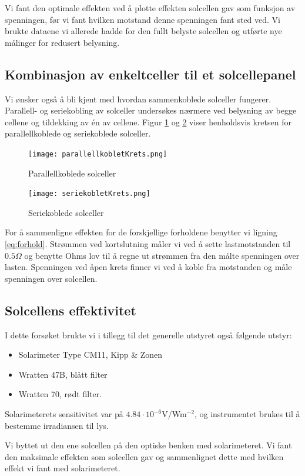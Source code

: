 \documentclass[a4paper,11pt, twocolumn]{article}
\begin{document}
Vi fant den optimale effekten ved å plotte effekten solcellen gav som funksjon av spenningen, før vi fant hvilken motstand denne spenningen fant sted ved. Vi brukte dataene vi allerede hadde for den fullt belyste solcellen og utførte nye målinger for redusert belysning.
\subsection{Kombinasjon av enkeltceller til et solcellepanel}
Vi ønsker også å bli kjent med hvordan sammenkoblede solceller fungerer. Parallell- og seriekobling av solceller undersøkes nærmere ved belysning av begge cellene og tildekking av \'en av cellene. Figur \ref{fig:parallell} og \ref{fig:serie} viser henholdsvis kretsen for parallellkoblede og seriekoblede solceller.
\begin{figure}[!ht]
	\texttt{[image: parallellkobletKrets.png]}
	\caption{Parallellkoblede solceller}
	\label{fig:parallell}
\end{figure}

\begin{figure}[!ht]
	\texttt{[image: seriekobletKrets.png]}
	\caption{Seriekoblede solceller}
	\label{fig:serie}
\end{figure}

For å sammenligne effekten for de forskjellige forholdene benytter vi ligning \eqref{eq:forhold}. Strømmen ved kortslutning måler vi ved å sette lastmotstanden til $0.5\Omega$ og benytte Ohms lov til å regne ut strømmen fra den målte spenningen over lasten. Spenningen ved åpen krets finner vi ved å koble fra motstanden og måle spenningen over solcellen.

\subsection{Solcellens effektivitet}
I dette forsøket brukte vi i tillegg til det generelle utstyret også følgende utstyr:

\begin{itemize}
	\item Solarimeter Type CM11, Kipp \& Zonen
	\item Wratten 47B, blått filter
	\item Wratten 70, rødt filter.
\end{itemize}
Solarimeterets sensitivitet var på $4.84\cdot10^{-6}$V/Wm$^{-2}$, og instrumentet brukes til å bestemme irradiansen til lys.

Vi byttet ut den ene solcellen på den optiske benken med solarimeteret. Vi fant den maksimale effekten som solcellen gav og sammenlignet dette med hvilken effekt vi fant med solarimeteret. 
\end{document}
